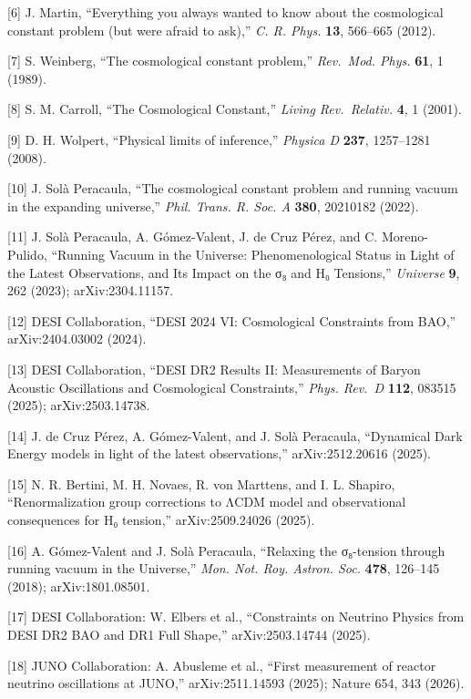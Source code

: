 \documentclass[
]{article}
\begin{document}
{[}6{]} J. Martin, ``Everything you always wanted to know about the
cosmological constant problem (but were afraid to ask),'' \emph{C. R.
Phys.} \textbf{13}, 566--665 (2012).

{[}7{]} S. Weinberg, ``The cosmological constant problem,''
\emph{Rev.~Mod. Phys.} \textbf{61}, 1 (1989).

{[}8{]} S. M. Carroll, ``The Cosmological Constant,'' \emph{Living
Rev.~Relativ.} \textbf{4}, 1 (2001).

{[}9{]} D. H. Wolpert, ``Physical limits of inference,'' \emph{Physica
D} \textbf{237}, 1257--1281 (2008).

{[}10{]} J. Solà Peracaula, ``The cosmological constant problem and
running vacuum in the expanding universe,'' \emph{Phil. Trans. R. Soc.
A} \textbf{380}, 20210182 (2022).

{[}11{]} J. Solà Peracaula, A. Gómez-Valent, J. de Cruz Pérez, and C.
Moreno-Pulido, ``Running Vacuum in the Universe: Phenomenological Status
in Light of the Latest Observations, and Its Impact on the σ₈ and H₀
Tensions,'' \emph{Universe} \textbf{9}, 262 (2023); arXiv:2304.11157.

{[}12{]} DESI Collaboration, ``DESI 2024 VI: Cosmological Constraints
from BAO,'' arXiv:2404.03002 (2024).

{[}13{]} DESI Collaboration, ``DESI DR2 Results II: Measurements of
Baryon Acoustic Oscillations and Cosmological Constraints,'' \emph{Phys.
Rev.~D} \textbf{112}, 083515 (2025); arXiv:2503.14738.

{[}14{]} J. de Cruz Pérez, A. Gómez-Valent, and J. Solà Peracaula,
``Dynamical Dark Energy models in light of the latest observations,''
arXiv:2512.20616 (2025).

{[}15{]} N. R. Bertini, M. H. Novaes, R. von Marttens, and I. L.
Shapiro, ``Renormalization group corrections to ΛCDM model and
observational consequences for H₀ tension,'' arXiv:2509.24026 (2025).

{[}16{]} A. Gómez-Valent and J. Solà Peracaula, ``Relaxing the
σ₈-tension through running vacuum in the Universe,'' \emph{Mon. Not.
Roy. Astron. Soc.} \textbf{478}, 126--145 (2018); arXiv:1801.08501.

{[}17{]} DESI Collaboration: W. Elbers et al., ``Constraints on Neutrino
Physics from DESI DR2 BAO and DR1 Full Shape,'' arXiv:2503.14744 (2025).

{[}18{]} JUNO Collaboration: A. Abusleme et al., ``First measurement of
reactor neutrino oscillations at JUNO,'' arXiv:2511.14593 (2025); Nature
654, 343 (2026).
\end{document}
